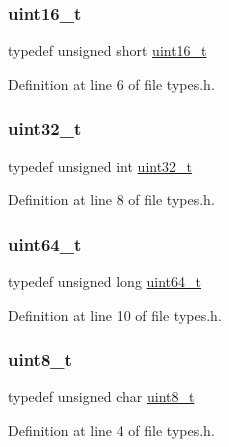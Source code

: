 \subsubsection{\texorpdfstring{uint16\+\_\+t}{uint16\_t}}
{\footnotesize\ttfamily typedef unsigned short \hyperlink{a00017_a273cf69d639a59973b6019625df33e30_a273cf69d639a59973b6019625df33e30}{uint16\+\_\+t}}



Definition at line 6 of file types.\+h.

\mbox{\label{a00017_a435d1572bf3f880d55459d9805097f62_a435d1572bf3f880d55459d9805097f62}} 
\subsubsection{\texorpdfstring{uint32\+\_\+t}{uint32\_t}}
{\footnotesize\ttfamily typedef unsigned int \hyperlink{a00017_a435d1572bf3f880d55459d9805097f62_a435d1572bf3f880d55459d9805097f62}{uint32\+\_\+t}}



Definition at line 8 of file types.\+h.

\mbox{\label{a00017_aa232ecf786a74ce5363c36c10798d2b1_aa232ecf786a74ce5363c36c10798d2b1}} 
\subsubsection{\texorpdfstring{uint64\+\_\+t}{uint64\_t}}
{\footnotesize\ttfamily typedef unsigned long \hyperlink{a00017_aa232ecf786a74ce5363c36c10798d2b1_aa232ecf786a74ce5363c36c10798d2b1}{uint64\+\_\+t}}



Definition at line 10 of file types.\+h.

\mbox{\label{a00017_aba7bc1797add20fe3efdf37ced1182c5_aba7bc1797add20fe3efdf37ced1182c5}} 
\subsubsection{\texorpdfstring{uint8\+\_\+t}{uint8\_t}}
{\footnotesize\ttfamily typedef unsigned char \hyperlink{a00017_aba7bc1797add20fe3efdf37ced1182c5_aba7bc1797add20fe3efdf37ced1182c5}{uint8\+\_\+t}}



Definition at line 4 of file types.\+h.

